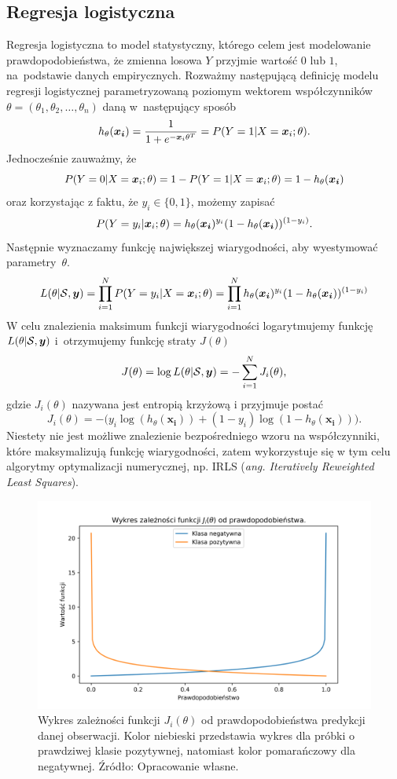 \documentclass[inzynierska]{pwr_wmat_praca_dyplomowa}
\theoremstyle{plain}
\numberwithin{theorem}{chapter}
\theoremstyle{definition}
\numberwithin{theorem}{chapter}
\begin{document}
\subsection{Regresja logistyczna}
\label{reg-log}
Regresja logistyczna to model statystyczny, którego celem jest modelowanie prawdopodobieństwa, że zmienna losowa $Y$ przyjmie wartość $0$ lub $1$, na~podstawie danych empirycznych. Rozważmy następującą definicję modelu regresji logistycznej parametryzowaną poziomym wektorem współczynników $\theta = (\theta_1, \theta_2, \dots, \theta_n)$ daną w~następujący sposób
\begin{equation}
	h_{\theta}(\boldsymbol{x_i}) = \frac{1}{1+e^{-\boldsymbol{x}_{i}\theta^T}} = P(Y = 1|X = \boldsymbol{x}_{i};\theta) \text{.}
\end{equation} 
Jednocześnie zauważmy, że
$$ P(Y = 0|X = \boldsymbol{x}_{i};\theta) = 1 - P(Y = 1|X = \boldsymbol{x}_{i};\theta) = 1 - h_{\theta}(\boldsymbol{x_i}) $$
oraz korzystając z faktu, że $y_i \in \{0,1\}$, możemy zapisać 
$$ P(Y = y_i|\boldsymbol{x}_{i};\theta) = h_{\theta}(\boldsymbol{x_i})^{y_i}(1-h_{\theta}(\boldsymbol{x_i}))^{(1-y_i)} \text{.}$$
Następnie wyznaczamy funkcję największej wiarygodności, aby wyestymować parametry~$\theta$.
$$ L(\theta | \mathcal{S}, \boldsymbol{y}) = \prod_{i=1}^N P(Y = y_i | X = \boldsymbol{x}_{i}; \theta) = \prod_{i=1}^N h_{\theta}(\boldsymbol{x_i})^{y_i}(1-h_{\theta}(\boldsymbol{x_i}))^{(1-y_i)}$$
W celu znalezienia maksimum funkcji wiarygodności logarytmujemy funkcję $L(\theta | \mathcal{S}, \boldsymbol{y})$ i~otrzymujemy funkcję straty $J(\theta)$
$$ J(\theta) = \log L(\theta | \mathcal{S}, \boldsymbol{y})  = -\sum_{i=1}^N J_i(\theta)\text{,}$$
gdzie $J_i(\theta)$ nazywana jest entropią krzyżową i przyjmuje postać
\begin{equation}
	\label{c-e}
	J_i(\theta) = -\big(y_i\log(h_{\theta}(\boldsymbol{x_i})) + (1-y_i)\log(1 - h_{\theta}(\boldsymbol{x_i}))\big) \text{.}
\end{equation}
Niestety nie jest możliwe znalezienie bezpośredniego wzoru na współczynniki, które maksymalizują funkcję wiarygodności, zatem wykorzystuje się w tym celu algorytmy optymalizacji numerycznej, np. IRLS (\textit{ang. Iteratively Reweighted Least Squares}).

\begin{figure}[h]
	\includegraphics[width=\linewidth]{images/cross_entropy.png}
	\caption{Wykres zależności funkcji $J_i(\theta)$ od prawdopodobieństwa predykcji danej obserwacji. Kolor niebieski przedstawia wykres dla próbki o prawdziwej klasie pozytywnej, natomiast kolor pomarańczowy dla negatywnej. Źródło: Opracowanie własne.}
	\label{fig:cross-entropy-plot}
\end{figure}
\end{document}
